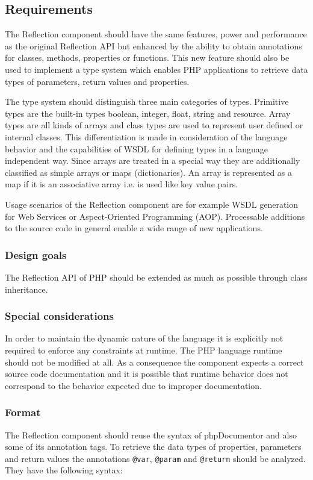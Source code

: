 \documentclass[10pt,final,a4paper,oneside]{article}
\begin{document}
\subsection{Requirements}\label{subsec:ReflectionRequirements}
The Reflection component should have
the same features, power and performance
as the original Reflection API
but enhanced by the ability to obtain annotations
for classes, methods, properties or functions.
This new feature should also be used
to implement a type system
which enables PHP applications to retrieve
data types of parameters, return values and properties.

The type system should distinguish three main categories of types.
Primitive types are the built-in types boolean, integer, float, string and resource.
Array types are all kinds of arrays and
class types are used to represent user defined or internal classes.
This differentiation is made
in consideration of the language behavior
and the capabilities of WSDL for defining types
in a language independent way.
Since arrays are treated in a special way
they are additionally classified as simple arrays or maps (dictionaries).
An array is represented as a map if it is an associative array
i.e. is used like key value pairs.

Usage scenarios of the Reflection component are
for example WSDL generation for Web Services
or Aspect-Oriented Programming (AOP).
Processable additions to the source code in general
enable a wide range of new applications.

\subsubsection{Design goals}
The Reflection API of PHP should be extended
as much as possible through class inheritance.

\subsubsection{Special considerations}
In order to maintain the dynamic nature of the language
it is explicitly not required
to enforce any constraints at runtime.
The PHP language runtime should not be modified at all.
As a consequence the component expects a correct source code documentation
and it is possible that runtime behavior does not correspond
to the behavior expected due to improper documentation.

\subsubsection{Format}\label{subsubsec:ReflectionFormat}
The Reflection component should reuse the syntax
of phpDocumentor \cite{phpDocumentor}
and also some of its annotation tags.
To retrieve the data types of properties,
parameters and return values the annotations
\verb|@var|,
\verb|@param| and
\verb|@return| should be analyzed.
They have the following syntax:
\end{document}
